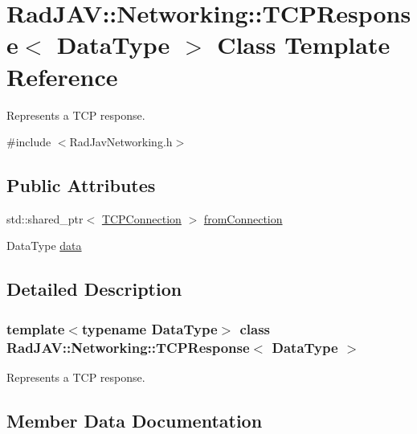 \hypertarget{class_rad_j_a_v_1_1_networking_1_1_t_c_p_response}{}\section{Rad\+J\+AV\+:\+:Networking\+:\+:T\+C\+P\+Response$<$ Data\+Type $>$ Class Template Reference}
\label{class_rad_j_a_v_1_1_networking_1_1_t_c_p_response}


Represents a T\+CP response.  




{\ttfamily \#include $<$Rad\+Jav\+Networking.\+h$>$}

\subsection*{Public Attributes}
\begin{DoxyCompactItemize}
\item 
std\+::shared\+\_\+ptr$<$ \mbox{\hyperlink{class_rad_j_a_v_1_1_networking_1_1_t_c_p_connection}{T\+C\+P\+Connection}} $>$ \mbox{\hyperlink{class_rad_j_a_v_1_1_networking_1_1_t_c_p_response_a256974dab7fab1800d974135d8aa1f47}{from\+Connection}}
\item 
Data\+Type \mbox{\hyperlink{class_rad_j_a_v_1_1_networking_1_1_t_c_p_response_ae5bd39a2e169a0f19e16614c6f76de8d}{data}}
\end{DoxyCompactItemize}


\subsection{Detailed Description}
\subsubsection*{template$<$typename Data\+Type$>$\newline
class Rad\+J\+A\+V\+::\+Networking\+::\+T\+C\+P\+Response$<$ Data\+Type $>$}

Represents a T\+CP response. 

\subsection{Member Data Documentation}
\mbox{\label{class_rad_j_a_v_1_1_networking_1_1_t_c_p_response_ae5bd39a2e169a0f19e16614c6f76de8d}} 
